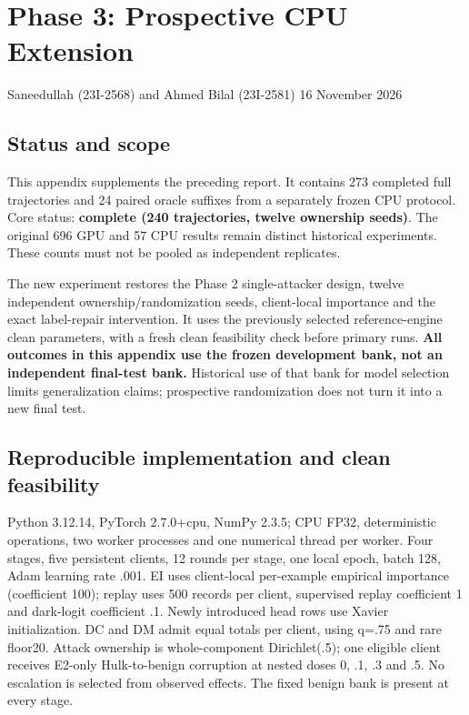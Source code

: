 \documentclass[
  10pt,
  a4paper,
]{article}
\author{}
\date{}
\begin{document}
\hypertarget{phase-3-prospective-cpu-extension}{%
\section{Phase 3: Prospective CPU
Extension}\label{phase-3-prospective-cpu-extension}}

Saneedullah (23I-2568) and Ahmed Bilal (23I-2581) \textbar{} 16 November
2026

\hypertarget{status-and-scope}{%
\subsection{Status and scope}\label{status-and-scope}}

This appendix supplements the preceding report. It contains 273
completed full trajectories and 24 paired oracle suffixes from a
separately frozen CPU protocol. Core status: \textbf{complete (240
trajectories, twelve ownership seeds)}. The original 696 GPU and 57 CPU
results remain distinct historical experiments. These counts must not be
pooled as independent replicates.

The new experiment restores the Phase 2 single-attacker design, twelve
independent ownership/randomization seeds, client-local importance and
the exact label-repair intervention. It uses the previously selected
reference-engine clean parameters, with a fresh clean feasibility check
before primary runs. \textbf{All outcomes in this appendix use the
frozen development bank, not an independent final-test bank.} Historical
use of that bank for model selection limits generalization claims;
prospective randomization does not turn it into a new final test.

\hypertarget{reproducible-implementation-and-clean-feasibility}{%
\subsection{Reproducible implementation and clean
feasibility}\label{reproducible-implementation-and-clean-feasibility}}

Python 3.12.14, PyTorch 2.7.0+cpu, NumPy 2.3.5; CPU FP32, deterministic
operations, two worker processes and one numerical thread per worker.
Four stages, five persistent clients, 12 rounds per stage, one local
epoch, batch 128, Adam learning rate .001. EI uses client-local
per-example empirical importance (coefficient 100); replay uses 500
records per client, supervised replay coefficient 1 and dark-logit
coefficient .1. Newly introduced head rows use Xavier initialization. DC
and DM admit equal totals per client, using q=.75 and rare floor20.
Attack ownership is whole-component Dirichlet(.5); one eligible client
receives E2-only Hulk-to-benign corruption at nested doses 0, .1, .3 and
.5. No escalation is selected from observed effects. The fixed benign
bank is present at every stage.
\end{document}

